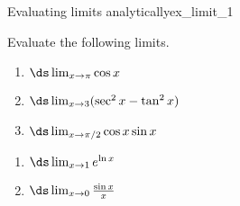 \begin{example}{Evaluating limits analytically}{ex_limit_1}{
Evaluate the following limits. 

\noindent\begin{minipage}[t]{.5\textwidth}
\begin{enumerate}
\item		$\ds \lim_{x\to \pi} \cos x$
\item		$\ds \lim_{x\to 3} (\sec^2x - \tan^2 x)$
\item		$\ds \lim_{x\to \pi/2} \cos x\sin x$
\end{enumerate}
\end{minipage}
\begin{minipage}[t]{.5\textwidth}
\begin{enumerate}\addtocounter{enumi}{3}
\item		$\ds \lim_{x\to 1} e^{\ln x}$
\item		$\ds \lim_{x\to 0} \frac{\sin x}{x}$
\end{enumerate}
\end{minipage}
}
\end{example}


